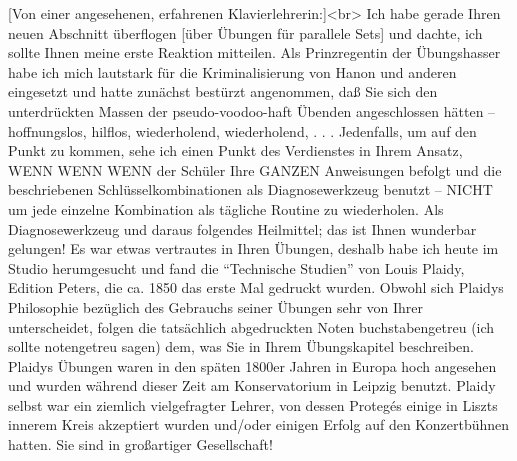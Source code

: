\item \label{testimonials03}
[Von einer angesehenen, erfahrenen Klavierlehrerin:]<br>
Ich habe gerade Ihren neuen Abschnitt überflogen [über Übungen für parallele Sets] und dachte, ich sollte Ihnen meine erste Reaktion mitteilen.
Als Prinzregentin der Übungshasser habe ich mich lautstark für die Kriminalisierung von Hanon und anderen eingesetzt und hatte zunächst bestürzt angenommen, daß Sie sich den unterdrückten Massen der pseudo-voodoo-haft Übenden angeschlossen hätten -- hoffnungslos, hilflos, wiederholend, wiederholend, . . .
Jedenfalls, um auf den Punkt zu kommen, sehe ich einen Punkt des Verdienstes in Ihrem Ansatz, WENN WENN WENN der Schüler Ihre GANZEN Anweisungen befolgt und die beschriebenen Schlüsselkombinationen als Diagnosewerkzeug benutzt -- NICHT um jede einzelne Kombination als tägliche Routine zu wiederholen.
Als Diagnosewerkzeug und daraus folgendes Heilmittel; das ist Ihnen wunderbar gelungen!
Es war etwas vertrautes in Ihren Übungen, deshalb habe ich heute im Studio herumgesucht und fand die \enquote{Technische Studien} von Louis Plaidy, Edition Peters, die ca. 1850 das erste Mal gedruckt wurden.
Obwohl sich Plaidys Philosophie bezüglich des Gebrauchs seiner Übungen sehr von Ihrer unterscheidet, folgen die tatsächlich abgedruckten Noten buchstabengetreu (ich sollte notengetreu sagen) dem, was Sie in Ihrem Übungskapitel beschreiben.
Plaidys Übungen waren in den späten 1800er Jahren in Europa hoch angesehen und wurden während dieser Zeit am Konservatorium in Leipzig benutzt.
Plaidy selbst war ein ziemlich vielgefragter Lehrer, von dessen Protegés einige in Liszts innerem Kreis akzeptiert wurden und/oder einigen Erfolg auf den Konzertbühnen hatten.
Sie sind in großartiger Gesellschaft!


